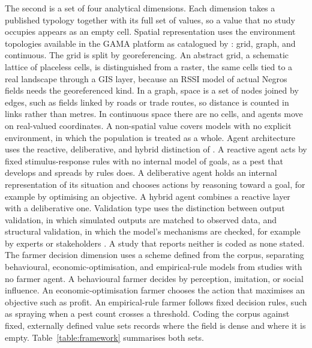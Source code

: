 The second is a set of four analytical dimensions. Each dimension takes a published typology together with its full set of values, so a value that no study occupies appears as an empty cell. Spatial representation uses the environment topologies available in the GAMA platform as catalogued by \citet{Taillandier2019}: grid, graph, and continuous. The grid is split by georeferencing. An abstract grid, a schematic lattice of placeless cells, is distinguished from a raster, the same cells tied to a real landscape through a GIS layer, because an RSSI model of actual Negros fields needs the georeferenced kind. In a graph, space is a set of nodes joined by edges, such as fields linked by roads or trade routes, so distance is counted in links rather than metres. In continuous space there are no cells, and agents move on real-valued coordinates. A non-spatial value covers models with no explicit environment, in which the population is treated as a whole. Agent architecture uses the reactive, deliberative, and hybrid distinction of \citet{Wooldridge1995}. A reactive agent acts by fixed stimulus-response rules with no internal model of goals, as a pest that develops and spreads by rules does. A deliberative agent holds an internal representation of its situation and chooses actions by reasoning toward a goal, for example by optimising an objective. A hybrid agent combines a reactive layer with a deliberative one. Validation type uses the distinction between output validation, in which simulated outputs are matched to observed data, and structural validation, in which the model's mechanisms are checked, for example by experts or stakeholders \citep{Rykiel1996}. A study that reports neither is coded as none stated. The farmer decision dimension uses a scheme defined from the corpus, separating behavioural, economic-optimisation, and empirical-rule models from studies with no farmer agent. A behavioural farmer decides by perception, imitation, or social influence. An economic-optimisation farmer chooses the action that maximises an objective such as profit. An empirical-rule farmer follows fixed decision rules, such as spraying when a pest count crosses a threshold. Coding the corpus against fixed, externally defined value sets records where the field is dense and where it is empty. Table~\ref{table:framework} summarises both sets.

